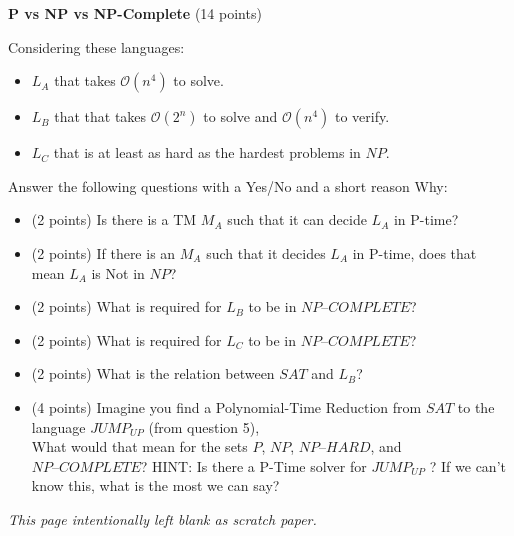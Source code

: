 \documentclass[12pt]{article}
\newenvironment{question}[2][Question]{\begin{trivlist}
\item[\hskip \labelsep {\bfseries #1}\hskip \labelsep {\bfseries #2.}]}{\end{trivlist}}
\begin{document}
\newpage

\begin{question}{7}\textbf{P vs NP vs NP-Complete} (14 points)

Considering these languages:
\begin{itemize}
    \item $L_A$ that takes $\mathcal{O}(n^4)$ to solve.
    \item $L_B$ that that takes $\mathcal{O}(2^n)$ to solve and $\mathcal{O}(n^4)$ to verify.
    \item $L_C$ that is at least as hard as the hardest problems in $NP$.
\end{itemize}

Answer the following questions with a Yes/No and a short reason Why:

\begin{itemize}
    \item (2 points) Is there is a TM $M_A$ such that it can decide $L_A$ in P-time?
    \vspace{3em}
    \item (2 points) If there is an $M_A$ such that it decides $L_A$ in P-time, does that mean $L_A$ is Not in $NP$?
    \vspace{3em}
    \item (2 points) What is required for $L_B$ to be in $NP\textrm{--}COMPLETE$?
    \vspace{3em}
    \item (2 points) What is required for $L_C$ to be in $NP\textrm{--}COMPLETE$?
    \vspace{3em}
    \item (2 points) What is the relation between $SAT$ and $L_B$?
    \vspace{3em}
\end{itemize}

\begin{itemize}
    \item (4 points) Imagine you find a Polynomial-Time Reduction from $SAT$ to the language $JUMP_{UP}$ (from question 5),\\
    What would that mean for the sets $P$, $NP$, $NP\textrm{--}HARD$, and $NP\textrm{--}COMPLETE$?
    HINT: Is there a P-Time solver for $JUMP_{UP}$ ? If we can't know this, what is the most we can say?
    \vspace{4em}

\end{itemize}

\end{question}

\newpage

\clearpage

\begin{center}
\vspace{-3em}
\textit{This page intentionally left blank as scratch paper.}
\end{center}


\end{document}
